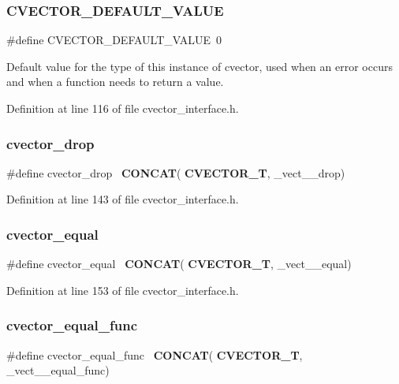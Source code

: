 \subsubsection{C\+V\+E\+C\+T\+O\+R\+\_\+\+D\+E\+F\+A\+U\+L\+T\+\_\+\+V\+A\+L\+UE}
{\footnotesize\ttfamily \#define C\+V\+E\+C\+T\+O\+R\+\_\+\+D\+E\+F\+A\+U\+L\+T\+\_\+\+V\+A\+L\+UE~0}

Default value for the type of this instance of cvector, used when an error occurs and when a function needs to return a value. 

Definition at line 116 of file cvector\+\_\+interface.\+h.

\mbox{\label{cvector__interface_8h_a009303f26977e797d7c143e38c4d263e}} 
\subsubsection{cvector\+\_\+drop}
{\footnotesize\ttfamily \#define cvector\+\_\+drop~\textbf{ C\+O\+N\+C\+AT}(\textbf{ C\+V\+E\+C\+T\+O\+R\+\_\+T}, \+\_\+vect\+\_\+\+\_\+drop)}



Definition at line 143 of file cvector\+\_\+interface.\+h.

\mbox{\label{cvector__interface_8h_ab07788ebb25a6870bde19ba5cbb61060}} 
\subsubsection{cvector\+\_\+equal}
{\footnotesize\ttfamily \#define cvector\+\_\+equal~\textbf{ C\+O\+N\+C\+AT}(\textbf{ C\+V\+E\+C\+T\+O\+R\+\_\+T}, \+\_\+vect\+\_\+\+\_\+equal)}



Definition at line 153 of file cvector\+\_\+interface.\+h.

\mbox{\label{cvector__interface_8h_a17a4990f478c035ab4bef0716c7b9354}} 
\subsubsection{cvector\+\_\+equal\+\_\+func}
{\footnotesize\ttfamily \#define cvector\+\_\+equal\+\_\+func~\textbf{ C\+O\+N\+C\+AT}(\textbf{ C\+V\+E\+C\+T\+O\+R\+\_\+T}, \+\_\+vect\+\_\+\+\_\+equal\+\_\+func)}



